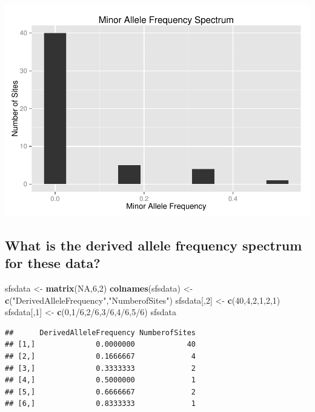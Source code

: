 \documentclass[]{article}
\newenvironment{Shaded}{\begin{snugshade}}{\end{snugshade}}
\newcommand{\KeywordTok}[1]{\textcolor[rgb]{0.13,0.29,0.53}{\textbf{{#1}}}}
\newcommand{\DecValTok}[1]{\textcolor[rgb]{0.00,0.00,0.81}{{#1}}}
\newcommand{\StringTok}[1]{\textcolor[rgb]{0.31,0.60,0.02}{{#1}}}
\newcommand{\OtherTok}[1]{\textcolor[rgb]{0.56,0.35,0.01}{{#1}}}
\newcommand{\NormalTok}[1]{{#1}}
\begin{document}
\includegraphics{munjal-201d-ps1_files/figure-latex/unnamed-chunk-27-1.pdf}
\pagebreak

\subsection{What is the derived allele frequency spectrum for these
data?}\label{what-is-the-derived-allele-frequency-spectrum-for-these-data}

\begin{Shaded}
\begin{Highlighting}[]
\NormalTok{sfsdata <-}\StringTok{ }\KeywordTok{matrix}\NormalTok{(}\OtherTok{NA}\NormalTok{,}\DecValTok{6}\NormalTok{,}\DecValTok{2}\NormalTok{)}
\KeywordTok{colnames}\NormalTok{(sfsdata) <-}\StringTok{ }\KeywordTok{c}\NormalTok{(}\StringTok{"DerivedAlleleFrequency"}\NormalTok{,}\StringTok{"NumberofSites"}\NormalTok{)}
\NormalTok{sfsdata[,}\DecValTok{2}\NormalTok{] <-}\StringTok{ }\KeywordTok{c}\NormalTok{(}\DecValTok{40}\NormalTok{,}\DecValTok{4}\NormalTok{,}\DecValTok{2}\NormalTok{,}\DecValTok{1}\NormalTok{,}\DecValTok{2}\NormalTok{,}\DecValTok{1}\NormalTok{)}
\NormalTok{sfsdata[,}\DecValTok{1}\NormalTok{] <-}\StringTok{ }\KeywordTok{c}\NormalTok{(}\DecValTok{0}\NormalTok{,}\DecValTok{1}\NormalTok{/}\DecValTok{6}\NormalTok{,}\DecValTok{2}\NormalTok{/}\DecValTok{6}\NormalTok{,}\DecValTok{3}\NormalTok{/}\DecValTok{6}\NormalTok{,}\DecValTok{4}\NormalTok{/}\DecValTok{6}\NormalTok{,}\DecValTok{5}\NormalTok{/}\DecValTok{6}\NormalTok{)}
\NormalTok{sfsdata}
\end{Highlighting}
\end{Shaded}

\begin{verbatim}
##      DerivedAlleleFrequency NumberofSites
## [1,]              0.0000000            40
## [2,]              0.1666667             4
## [3,]              0.3333333             2
## [4,]              0.5000000             1
## [5,]              0.6666667             2
## [6,]              0.8333333             1
\end{verbatim}
\end{document}
